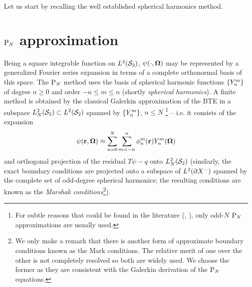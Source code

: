 Let us start by recalling the well established spherical harmonics method.

\section{$\PN$ approximation}\label{sec:SPH}
Being a square integrable function on $\Lp[2](\Sphere)$, $\psi(\cdot,\bomega)$ may be represented by a generalized
Fourier series expansion in terms of a complete orthonormal basis of this space. The $\PN$ method uses the basis of
spherical harmonic functions $\{\Y{n}{m}\}$ of degree $n\geq 0$ and order $-n \leq m \leq n$ (shortly
\textit{spherical harmonics}). A finite method is obtained by the classical Galerkin approximation of the BTE in a
subspace $\Lp[2]_N(\Sphere)\subset\Lp[2](\Sphere)$ spanned by $\{\Y{n}{m}\}$,  $n \leq N$ \footnote{For subtle reasons
that could be found in the literature (\cite[Sec. 10.3.2]{Davison}, \cite[Sec. 9.6]{Stacey1}), only odd-$N$ $\PN$
approximations are usually used.} -- i.e. it consists of the expansion
\begin{equation}\label{eq:exp}
  \psi(\br,\bomega) \approx \suma[n]{0}{N}\suma[m]{-n}{n}\angmom{n}{m}(\br)\Y{n}{m}(\bomega)
\end{equation}
and orthogonal projection of the residual $T\psi - q$ onto $\Lp[2]_N(\Sphere)$ (similarly, the exact boundary conditions 
are projected onto a subspace of $\Lp[2](\pX[-])$ spanned by the complete set of odd-degree spherical harmonics; 
the resulting conditions are known as the \textit{Marshak conditions}\footnote{We only make a remark that there is 
another form of approximate boundary conditions known as the Mark conditions. The relative merit of one over the other 
is not completely resolved so both are widely used. We choose the former as they are consistent with the Galerkin 
derivation of the $\PN$ equations.}).

